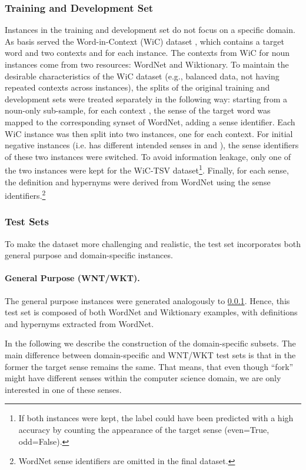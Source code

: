 \documentclass[11pt,a4paper]{article}
\begin{document}
\subsubsection{Training and Development Set}
\label{train+dev const}
Instances in the training and development set do not focus on a specific domain. 
As basis served the Word-in-Context (WiC) dataset \cite{pilehvar-camacho-collados-2019-wic}, which contains a target word  and two contexts  and  for each instance. 
The contexts from WiC for noun instances come from two resources: WordNet and Wiktionary. 
To maintain the desirable characteristics of the WiC dataset (e.g., balanced data, not having repeated contexts across instances), the splits of the original training and development sets were treated separately in the following way: starting from a noun-only sub-sample, for each context , the sense of the target word  was mapped to the corresponding synset of WordNet, adding a sense identifier.
Each WiC instance was then split into two instances, one for each context.
For initial negative instances (i.e.  has different intended senses in  and ), the sense identifiers of these two instances were switched. To avoid information leakage, only one of the two instances were kept for the WiC-TSV dataset\footnote{If both instances were kept, the label could have been predicted with a high accuracy by counting the appearance of the target sense (even=True, odd=False).}. Finally, for each sense, the definition and hypernyms were derived from WordNet using the sense identifiers.\footnote{WordNet sense identifiers are omitted in the final dataset.}

\subsubsection{Test Sets}
\label{domain}

To make the dataset more challenging and realistic, the test set incorporates both general purpose and domain-specific instances. 


\paragraph{General Purpose (WNT/WKT).}
The general purpose instances were generated analogously to \ref{train+dev const}. Hence, this test set is composed of both WordNet and Wiktionary examples, with definitions and hypernyms extracted from WordNet.

In the following we describe the construction of the domain-specific subsets.
The main difference between domain-specific and WNT/WKT test sets is that in the former the target sense remains the same. That means, that even though ``fork'' might have different senses within the computer science domain, we are only interested in one of these senses.
\end{document}
